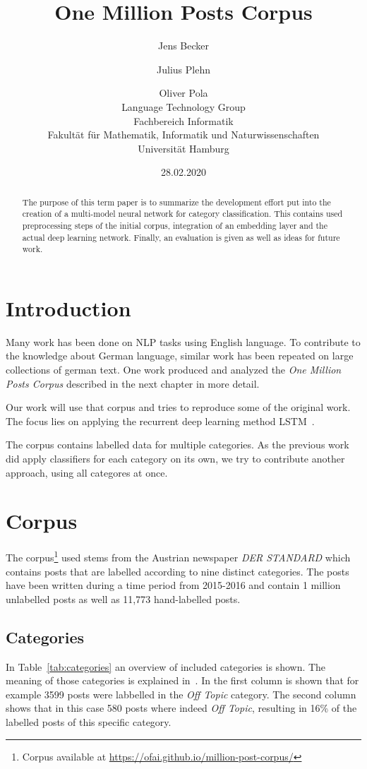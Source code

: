 \documentclass[11pt,a4paper]{article}
\title{One Million Posts Corpus}
\author{Jens Becker \and Julius Plehn \and Oliver Pola \\ 
	Language Technology Group \\
	Fachbereich Informatik \\
	Fakultät für Mathematik, Informatik und Naturwissenschaften \\
	Universität Hamburg
}
\date{28.02.2020}
\begin{document}
\maketitle
\begin{abstract}
The purpose of this term paper is to summarize the development effort put into the creation of a multi-model neural network for category classification. This contains used preprocessing steps of the initial corpus, integration of an embedding layer and the actual deep learning network. Finally, an evaluation is given as well as ideas for future work. 

 
\end{abstract}

\section{Introduction}

Many work has been done on NLP tasks using English language.
To contribute to the knowledge about German language, similar work has been repeated on large collections of german text.
One work produced and analyzed the \textit{One Million Posts Corpus} described in the next chapter in more detail.~\cite{Schabus17, Schabus18}

Our work will use that corpus and tries to reproduce some of the original work.
The focus lies on applying the recurrent deep learning method LSTM~\cite{lstm}.

The corpus contains labelled data for multiple categories.
As the previous work did apply classifiers for each category on its own, we try to contribute another approach, using all categores at once.


\section{Corpus}
The corpus\footnote{Corpus available at \url{https://ofai.github.io/million-post-corpus/}} used stems from the Austrian newspaper \textit{DER STANDARD} which contains posts that are labelled according to nine distinct categories. The posts have been written during a time period from 2015-2016 and contain 1 million unlabelled posts as well as 11,773 hand-labelled posts.


\subsection{Categories}
In Table~\ref{tab:categories} an overview of included categories is shown. The meaning of those categories is explained in~\cite{Schabus17}. 
In the first column is shown that for example 3599 posts were labbelled in the \textit{Off Topic} category. 
The second column shows that in this case 580 posts where indeed \textit{Off Topic}, resulting in 16\% of the labelled posts of this specific category. 
\end{document}
